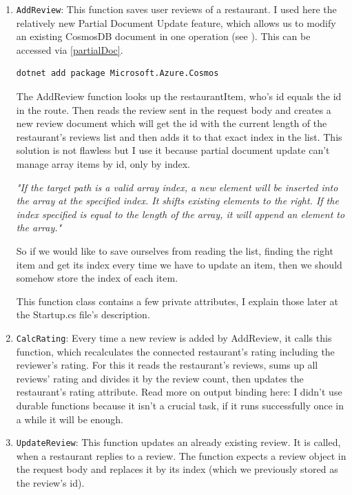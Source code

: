 \begin{enumerate}
	\item \verb+AddReview+: This function saves user reviews of a restaurant. I used here the relatively new Partial Document Update feature, which allows us to modify an existing CosmosDB document in one operation (see \cite{CosmosDBPartialDocumentUpdate}). This can be accessed via \ref{partialDoc}. 
	
	\lstset{ breaklines=true }
	\begin{lstlisting}[frame=single,float=!ht, caption=Adding partial document update to a Function App, label=partialDoc]
		dotnet add package Microsoft.Azure.Cosmos
	\end{lstlisting}

	The AddReview function looks up the restaurantItem, who's id equals the id in the route. Then reads the review sent in the request body and creates a new review document which will get the id with the current length of the restaurant's reviews list and then adds it to that exact index in the list. This solution is not flawless but I use it because partial document update can't manage array items by id, only by index. 	
	
	\emph{"If the target path is a valid array index, a new element will be inserted into the array at the specified index. It shifts existing elements to the right.
	If the index specified is equal to the length of the array, it will append an element to the array."  \cite{CosmosDBPartialDocumentUpdate}}
 	
	So if we would like to save ourselves from reading the list, finding the right item and get its index every time we have to update an item, then we should somehow store the index of each item. 
	
	This function class contains a few private attributes, I explain those later at the Startup.cs file's description.
	
	\item \verb+CalcRating+: Every time a new review is added by AddReview, it calls this function, which recalculates the connected restaurant's rating including the reviewer's rating. For this it reads the restaurant's reviews, sums up all reviews' rating and divides it by the review count, then updates the restaurant's rating attribute. Read more on output binding here: \cite{CosmosDBOutputBinding}
	I didn't use durable functions because it isn't a crucial task, if it runs successfully once in a while it will be enough.
	
	\item \verb+UpdateReview+: This function updates an already existing review. It is called, when a restaurant replies to a review. The function expects a review object in the request body and replaces it by its index (which we previously stored as the review's id). 
\end{enumerate}

